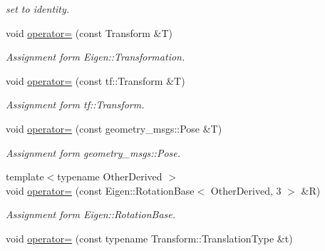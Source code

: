 \begin{DoxyCompactItemize}
\begin{DoxyCompactList}\small\item\em set to identity. \end{DoxyCompactList}\item 
void \hyperlink{classow__core_1_1CartesianPosition_a94bca79bf37ef9a5ddab1c157bd112ce}{operator=} (const Transform \&T)\hypertarget{classow__core_1_1CartesianPosition_a94bca79bf37ef9a5ddab1c157bd112ce}{}\label{classow__core_1_1CartesianPosition_a94bca79bf37ef9a5ddab1c157bd112ce}

\begin{DoxyCompactList}\small\item\em Assignment form Eigen\+::\+Transformation. \end{DoxyCompactList}\item 
void \hyperlink{classow__core_1_1CartesianPosition_a1384221faaf7c96e225f2cf918e55dab}{operator=} (const tf\+::\+Transform \&T)\hypertarget{classow__core_1_1CartesianPosition_a1384221faaf7c96e225f2cf918e55dab}{}\label{classow__core_1_1CartesianPosition_a1384221faaf7c96e225f2cf918e55dab}

\begin{DoxyCompactList}\small\item\em Assignment form tf\+::\+Transform. \end{DoxyCompactList}\item 
void \hyperlink{classow__core_1_1CartesianPosition_af191c6fbdd039462c5be22192bf2ad33}{operator=} (const geometry\+\_\+msgs\+::\+Pose \&T)\hypertarget{classow__core_1_1CartesianPosition_af191c6fbdd039462c5be22192bf2ad33}{}\label{classow__core_1_1CartesianPosition_af191c6fbdd039462c5be22192bf2ad33}

\begin{DoxyCompactList}\small\item\em Assignment form geometry\+\_\+msgs\+::\+Pose. \end{DoxyCompactList}\item 
{\footnotesize template$<$typename Other\+Derived $>$ }\\void \hyperlink{classow__core_1_1CartesianPosition_affc06373565107ca4fc0df32bf8092c9}{operator=} (const Eigen\+::\+Rotation\+Base$<$ Other\+Derived, 3 $>$ \&R)\hypertarget{classow__core_1_1CartesianPosition_affc06373565107ca4fc0df32bf8092c9}{}\label{classow__core_1_1CartesianPosition_affc06373565107ca4fc0df32bf8092c9}

\begin{DoxyCompactList}\small\item\em Assignment form Eigen\+::\+Rotation\+Base. \end{DoxyCompactList}\item 
void \hyperlink{classow__core_1_1CartesianPosition_ae712894313ad56e5f7aef7cdeff80cc4}{operator=} (const typename Transform\+::\+Translation\+Type \&t)\hypertarget{classow__core_1_1CartesianPosition_ae712894313ad56e5f7aef7cdeff80cc4}{}\label{classow__core_1_1CartesianPosition_ae712894313ad56e5f7aef7cdeff80cc4}


\end{DoxyCompactItemize}
